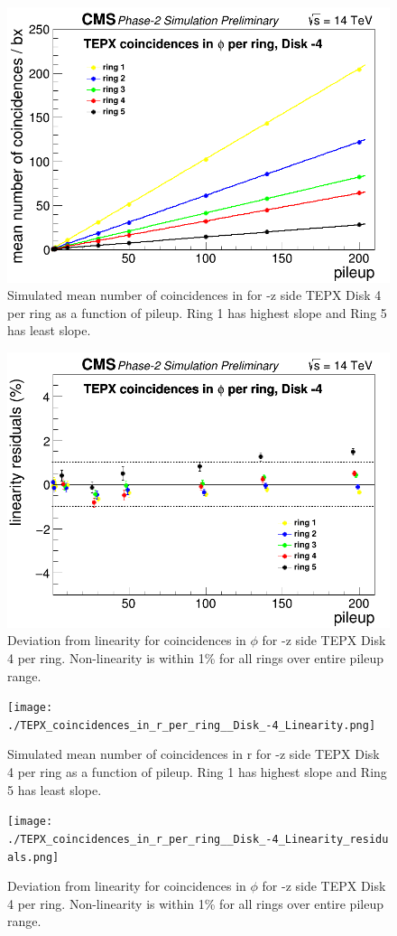 \begin{figure}[H]
  \centering
  \includegraphics[width=0.5\columnwidth]{./TEPX_coincidences_inphi_per_ring__Disk_-4_Linearity.png}
  \caption{Simulated mean number of coincidences in \phi for -z side TEPX Disk 4 per ring as a function of pileup. Ring 1 has highest slope and Ring 5 has least slope.}
  \label{fig:CMS}
\end{figure}


\begin{figure}[H]
  \centering
  \includegraphics[width=0.5\columnwidth]{./TEPX_coincidences_inphi_per_ring__Disk_-4_Linearity_residuals.png}
  \caption{Deviation from linearity for coincidences in $\phi$ for -z side TEPX Disk 4 per ring. Non-linearity is within 1\% for all rings over entire pileup range.}
  \label{fig:CMS}
\end{figure}



\begin{figure}[H]
  \centering
  \texttt{[image: ./TEPX\_coincidences\_in\_r\_per\_ring\_\_Disk\_-4\_Linearity.png]}
  \caption{Simulated mean number of coincidences in r for -z side TEPX Disk 4 per ring as a function of pileup. Ring 1 has highest slope and Ring 5 has least slope.}
  \label{fig:CMS}
\end{figure}


\begin{figure}[H]
  \centering
  \texttt{[image: ./TEPX\_coincidences\_in\_r\_per\_ring\_\_Disk\_-4\_Linearity\_residuals.png]}
  \caption{Deviation from linearity for coincidences in $\phi$ for -z side TEPX Disk 4 per ring. Non-linearity is within 1\% for all rings over entire pileup range.}
  \label{fig:CMS}
\end{figure}


